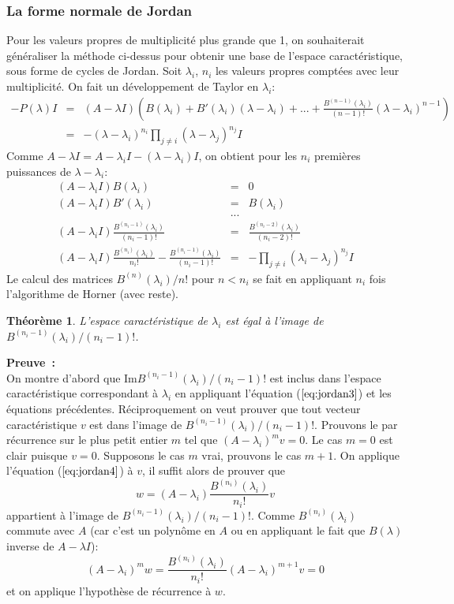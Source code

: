 \documentclass[a4paper,11pt]{article}
\newtheorem{thm}{Théorème}
\begin{document}
\begin{giacjshere}
\subsubsection{La forme normale de Jordan} \label{sec:jordan}
Pour les valeurs propres de multiplicit\'e plus grande que 1, on souhaiterait 
g\'en\'eraliser la m\'ethode ci-dessus pour obtenir une base
de l'espace caractéristique, sous forme de cycles de Jordan.
Soit $\lambda _i$, $n_i$ les valeurs propres compt\'ees avec leur 
multiplicit\'e. On fait un d\'eveloppement de Taylor en
$\lambda _i$:
\begin{eqnarray*} 
-P(\lambda )I&=&(A-\lambda I)\left(
B(\lambda_i )+ B'(\lambda _i)(\lambda -\lambda _i)
+ ... +  \frac{B^{(n-1)}(\lambda_i )}{(n-1)!} 
(\lambda -\lambda _i)^{n-1} \right) \\
&=& -(\lambda -\lambda _i)^{n_i}
\prod _{j\neq i} (\lambda -\lambda _j)^{n_j} I 
\end{eqnarray*}
Comme $A-\lambda I=A-\lambda _i I - (\lambda -\lambda _i)I$, on obtient
pour les $n_i$ premi\`eres puissances de $\lambda -\lambda _i$:
\begin{eqnarray} \label{eq:jordan1}
(A-\lambda _i I) B(\lambda _i)&=&0\\
(A-\lambda _i I) B'(\lambda _i)&=&B(\lambda_i )\\
& ... & \\
(A-\lambda _i I) \frac{B^{(n_i-1)}(\lambda _i)}{(n_i-1)!} &=& 
\frac{B^{(n_i-2)}(\lambda _i)}{(n_i-2)!} \label{eq:jordan3} \\
(A-\lambda _i I)\frac{B^{(n_i)}(\lambda_i)}{n_i!} -  
\frac{B^{(n_i-1)}(\lambda_i)}{(n_i-1)!}
&= &-\prod_{j\neq i}(\lambda _i-\lambda _j)^{n_j} I \label{eq:jordan4}
\end{eqnarray}
Le calcul des matrices $B^{(n)}(\lambda _i)/n!$ pour $n<n_i$ se fait en
appliquant $n_i$ fois l'algorithme de Horner (avec reste).

\begin{thm} \label{th:jordan}
L'espace caract\'eristique de $\lambda _i$ est égal à
l'image de $B^{(n_i-1)}(\lambda _i)/(n_i-1)!$.
\end{thm}
{\bf Preuve~:}\\
On montre d'abord que Im$B^{(n_i-1)}(\lambda _i)/(n_i-1)!$ est inclus
dans l'espace caractéristique correspondant à $\lambda_i$ en
appliquant l'\'equation (\(\ref{eq:jordan3}\)) et les \'equations précédentes.
Réciproquement on veut prouver que tout vecteur caract\'eristique $v$ est dans 
l'image de $B^{(n_i-1)}(\lambda _i)/(n_i-1)!$. Prouvons le par r\'ecurrence
sur le plus petit entier $m$ tel que
$(A-\lambda _i)^{m}v=0$. Le cas $m=0$ est clair puisque $v=0$.
Supposons le cas $m$ vrai, prouvons le cas $m+1$. On applique l'\'equation
(\(\ref{eq:jordan4}\)) \`a $v$, il suffit alors de prouver que
\[ w=(A-\lambda _i)\frac{B^{(n_i)}(\lambda_i)}{n_i!} v\]
appartient \`a l'image de
$B^{(n_i-1)}(\lambda _i)/(n_i-1)!$.
Comme $B^{(n_i)}(\lambda_i)$
commute avec $A$ (car c'est un polyn\^ome en $A$ ou en appliquant
le fait que $B(\lambda)$ inverse de $A-\lambda I$):
\[ (A-\lambda _i)^m w=\frac{B^{(n_i)}(\lambda_i)}{n_i!} 
(A-\lambda _i)^{m+1}v=0 \]
et on applique l'hypoth\`ese de r\'ecurrence \`a $w$.


\end{giacjshere}
\end{document}
